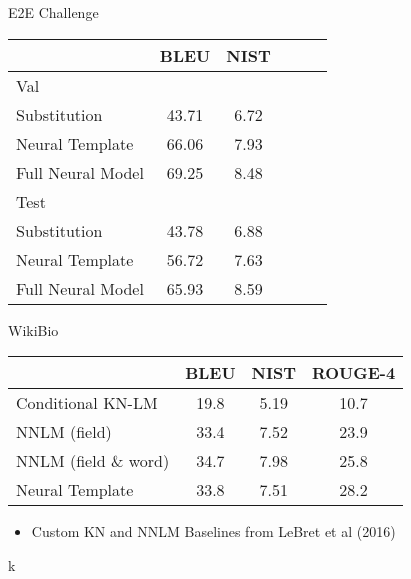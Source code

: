 \begin{frame}{E2E Challenge}
\begin{table}[t!]
\small
\centering
\begin{tabular}{@{}lccc@{\hspace{2.5mm}}c@{\hspace{2.5mm}}c@{}}
\toprule
 & BLEU & NIST \\
\midrule
Val & & &  \\
\midrule

Substitution  & 43.71 & 6.72 \\
Neural Template & 66.06 & 7.93 \\
Full Neural Model & 69.25 & 8.48 \\
\midrule
Test  & & \\
\midrule

Substitution & 43.78 & 6.88 \\
Neural Template    & 56.72 & 7.63 \\
Full Neural Model & 65.93 & 8.59 \\
\bottomrule
\end{tabular}
\label{tab:e2e}
\end{table}

\end{frame}


\begin{frame}{WikiBio}
\begin{table}[t!]
\small
\centering
\begin{tabular}{@{}lccc@{}}
\toprule
 & BLEU & NIST & ROUGE-4\\
\midrule
Conditional KN-LM  & 19.8 & 5.19 & 10.7 \\
NNLM (field)  & 33.4 & 7.52 & 23.9 \\
NNLM (field \& word)  & 34.7 & 7.98 & 25.8 \\
Neural Template &  33.8 & 7.51 & 28.2 \\
\bottomrule
\end{tabular}
\label{tab:wb}
\end{table}

\begin{itemize}
\item Custom KN and NNLM Baselines from LeBret et al (2016)
\end{itemize}k

\end{frame}



